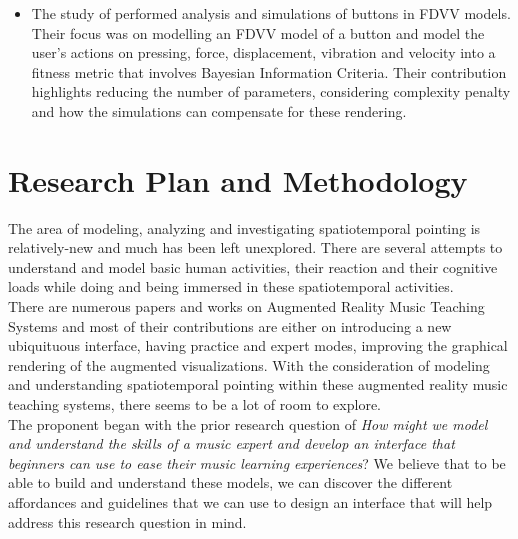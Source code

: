 \documentclass{article}
\begin{document}
\begin{itemize}
\item The study of \cite{liao2020button} performed analysis and simulations of buttons in FDVV models. Their focus was on modelling an FDVV model of a button and model the user's actions on pressing, force, displacement, vibration and velocity into a fitness metric that involves Bayesian Information Criteria. Their contribution highlights reducing the number of parameters, considering complexity penalty and how the simulations can compensate for these rendering. 
\end{itemize}
\section{Research Plan and Methodology}
The area of modeling, analyzing and investigating spatiotemporal pointing is relatively-new and much has been left unexplored. There are several attempts to understand and model basic human activities, their reaction and their cognitive loads while doing and being immersed in these spatiotemporal activities.\\
There are numerous papers and works on Augmented Reality Music Teaching Systems and most of their contributions are either on introducing a new ubiquituous interface, having practice and expert modes, improving the graphical rendering of the augmented visualizations. With the consideration of modeling and understanding spatiotemporal pointing within these augmented reality music teaching systems, there seems to be a lot of room to explore.\\
The proponent began with the prior research question of \textit{How might we model and understand the skills of a music expert and develop an interface that beginners can use to ease their music learning experiences}? We believe that to be able to build and understand these models, we can discover the different affordances and guidelines that we can use to design an interface that will help address this research question in mind.
\end{document}
